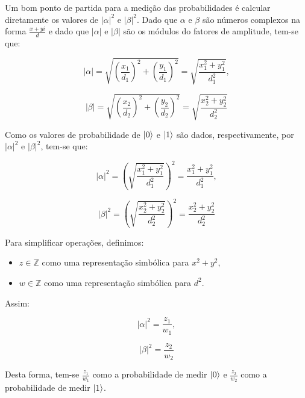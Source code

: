 \documentclass[12pt, a4paper]{article}
\begin{document}
Um bom ponto de partida para a medição das probabilidades é calcular diretamente os valores de \(|\alpha|^2\) e \(|\beta|^2\). Dado que \(\alpha\) e \(\beta\) são números complexos na forma \(\frac{x+yi}{d}\) e dado que \(|\alpha|\) e \(|\beta|\) são os módulos do fatores de amplitude, tem-se que:

\begin{equation}
|\alpha| = \sqrt{\left(\frac{x_1}{d_1}\right)^2+\left(\frac{y_1}{d_1}\right)^2} =  \sqrt{\frac{x_1^2+y_1^2}{d_1^2}},
\label{eq:mod_alpha}
\end{equation}

\begin{equation}
|\beta| = \sqrt{\left(\frac{x_2}{d_2}\right)^2+\left(\frac{y_2}{d_2}\right)^2} =  \sqrt{\frac{x_2^2+y_2^2}{d_2^2}}
\label{eq:mod_beta}
\end{equation}

Como os valores de probabilidade de \(\ket{0}\) e \(\ket{1}\) são dados, respectivamente, por \(|\alpha|^2\) e \(|\beta|^2\), tem-se que:

\begin{equation}
|\alpha|^2 = \left(\sqrt{\frac{x_1^2+y_1^2}{d_1^2}}\right)^2=\frac{x_1^2+y_1^2}{d_1^2},
\label{eq:mod_alpha_sqr}
\end{equation}

\begin{equation}
|\beta|^2 = \left(\sqrt{\frac{x_2^2+y_2^2}{d_2^2}}\right)^2=\frac{x_2^2+y_2^2}{d_2^2}
\label{eq:mod_beta_sqr}
\end{equation}

Para simplificar operações, definimos:
\begin{itemize}
\item \(z \in \mathbb{Z}\) como uma representação simbólica para \(x^2+y^2\),
\item \(w \in \mathbb{Z}\) como uma representação simbólica para \(d^2\).
\end{itemize}

Assim:

\begin{equation}
|\alpha|^2 = \frac{z_1}{w_1},
\label{eq:mod_alpha_sq_final}
\end{equation}

\begin{equation}
|\beta|^2 = \frac{z_2}{w_2}
\label{eq:mod_beta_sq_final}
\end{equation}

Desta forma, tem-se \(\frac{z_1}{w_1}\) como a probabilidade de medir \(\ket{0}\) e \(\frac{z_2}{w_2}\) como a probabilidade de medir \(\ket{1}\).
\end{document}
